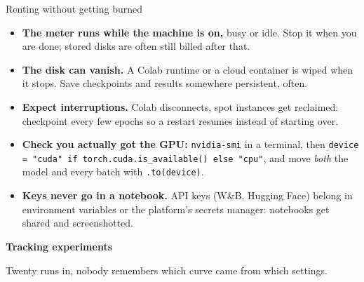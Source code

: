 \documentclass[aspectratio=43]{beamer}
\begin{document}
\begin{frame}{Renting without getting burned}
  \begin{itemize}\footnotesize
    \item \textbf{The meter runs while the machine is on,} busy or idle. Stop it when you are done;
      stored disks are often still billed after that.
    \item \textbf{The disk can vanish.} A Colab runtime or a cloud container is wiped when it
      stops. Save checkpoints and results somewhere persistent, often.
    \item \textbf{Expect interruptions.} Colab disconnects, spot instances get reclaimed: checkpoint
      every few epochs so a restart resumes instead of starting over.
    \item \textbf{Check you actually got the GPU:} \texttt{nvidia-smi} in a terminal, then
      \texttt{device = "cuda" if torch.cuda.is\_available() else "cpu"}, and move \emph{both} the
      model and every batch with \texttt{.to(device)}.
    \item \textbf{Keys never go in a notebook.} API keys (W\&B, Hugging Face) belong in environment
      variables or the platform's secrets manager: notebooks get shared and screenshotted.
  \end{itemize}
  \vfill
\end{frame}

\begin{frame}[plain]
  \vfill
  \begin{center}
    {\Large\color{popblue}\textbf{Tracking experiments}}\\[0.9em]
    \begin{minipage}{0.82\textwidth}\centering\small
      Twenty runs in, nobody remembers which curve came from which settings.
    \end{minipage}
  \end{center}
  \vfill
\end{frame}
\end{document}
